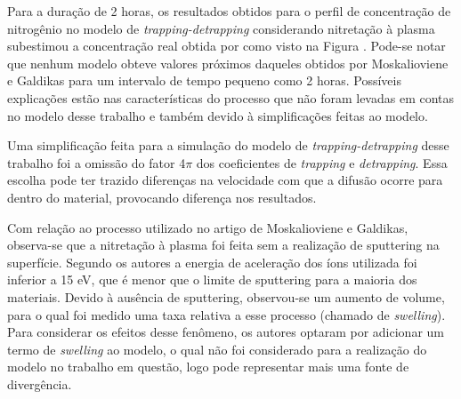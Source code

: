 

Para a duração de 2 horas, os resultados obtidos para o perfil de concentração de nitrogênio no modelo de \textit{trapping-detrapping} considerando nitretação à plasma subestimou a concentração real obtida por \cite{moskalioviene2011modeling} como visto na Figura . Pode-se notar que nenhum modelo obteve valores próximos daqueles obtidos por Moskalioviene e Galdikas para um intervalo de tempo pequeno como 2 horas. Possíveis explicações estão nas características do processo que não foram levadas em contas no modelo desse trabalho e também devido à simplificações feitas ao modelo.

Uma simplificação feita para a simulação do modelo de \textit{trapping-detrapping} desse trabalho foi a omissão do fator 4$\pi$ dos coeficientes de \textit{trapping} e  \textit{detrapping}. Essa escolha pode ter trazido diferenças na velocidade com que a difusão ocorre para dentro do material, provocando diferença nos resultados.

Com relação ao processo utilizado no artigo de Moskalioviene e Galdikas, observa-se que a nitretação à plasma foi feita sem a realização de sputtering na superfície. Segundo os autores a energia de aceleração dos íons utilizada foi inferior a 15 eV, que é menor que o limite de sputtering para a maioria dos materiais. Devido à ausência de sputtering, observou-se um aumento de volume, para o qual foi medido uma taxa relativa a esse processo (chamado de \textit{swelling}). Para considerar os efeitos desse fenômeno, os autores optaram por adicionar um termo de \textit{swelling} ao modelo, o qual não foi considerado para a realização do modelo no trabalho em questão, logo pode representar mais uma fonte de divergência.